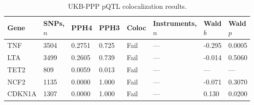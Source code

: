 \begin{table}[htbp]
\centering
\caption{UKB-PPP pQTL colocalization results.}\label{tab:ukbppp_pqtl_coloc}
\small
\begin{tabular}{llllllll}
\toprule
  Gene & SNPs, $n$ & PPH4 & PPH3 & Coloc & Instruments, $n$ & Wald $b$ & Wald $p$ \\
\midrule
  TNF & 3504 & 0.2751 & 0.725 & Fail & --- & -0.295 & 0.0005 \\
  LTA & 3499 & 0.2605 & 0.739 & Fail & --- & -0.014 & 0.5060 \\
  TET2 & 809 & 0.0059 & 0.013 & Fail & --- & --- & --- \\
  NCF2 & 1135 & 0.0000 & 1.000 & Fail & --- & -0.071 & 0.3070 \\
  CDKN1A & 1307 & 0.0000 & 1.000 & Fail & --- & 0.130 & 0.0200 \\
\bottomrule
\end{tabular}

\end{table}
